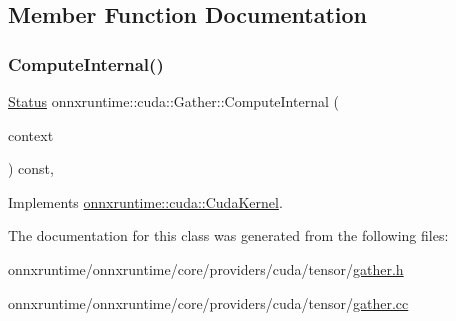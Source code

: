 \subsection{Member Function Documentation}
\mbox{\label{classonnxruntime_1_1cuda_1_1Gather_a515b0ccbd69b82dc830ed1b1f0dadfe2}} 
\subsubsection{\texorpdfstring{Compute\+Internal()}{ComputeInternal()}}
{\footnotesize\ttfamily \mbox{\hyperlink{classonnxruntime_1_1common_1_1Status}{Status}} onnxruntime\+::cuda\+::\+Gather\+::\+Compute\+Internal (\begin{DoxyParamCaption}\item[{\mbox{\hyperlink{classonnxruntime_1_1OpKernelContext}{Op\+Kernel\+Context}} $\ast$}]{context }\end{DoxyParamCaption}) const\hspace{0.3cm}{\ttfamily [override]}, {\ttfamily [virtual]}}



Implements \mbox{\hyperlink{classonnxruntime_1_1cuda_1_1CudaKernel_aca7af04ae448017d6023d30bba231ebb}{onnxruntime\+::cuda\+::\+Cuda\+Kernel}}.



The documentation for this class was generated from the following files\+:\begin{DoxyCompactItemize}
\item 
onnxruntime/onnxruntime/core/providers/cuda/tensor/\mbox{\hyperlink{cuda_2tensor_2gather_8h}{gather.\+h}}\item 
onnxruntime/onnxruntime/core/providers/cuda/tensor/\mbox{\hyperlink{cuda_2tensor_2gather_8cc}{gather.\+cc}}\end{DoxyCompactItemize}
